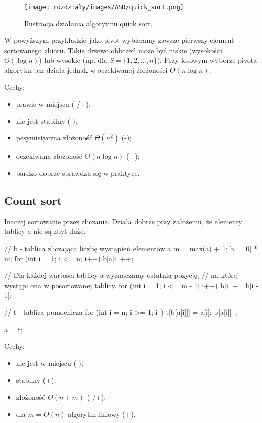 \begin{figure}[H]
    \centering
    \texttt{[image: rozdziały/images/ASD/quick\_sort.png]}
    \caption{Ilustracja działania algorytmu quick sort.}
\end{figure}

W powyższym przykładzie jako pivot wybieramy zawsze pierwszy element sortowanego zbioru. Takie drzewo obliczeń może być niskie (wysokości $O(\log n)$) lub wysokie (np. dla $S = \{1, 2, ..., n\})$. Przy losowym wyborze pivota algorytm ten działa jednak w oczekiwanej złożoności $\Theta(n \log n)$.

Cechy:
\begin{itemize}
    \item prawie w miejscu (-/+);
    \item nie jest stabilny (-);
    \item pesymistyczna złożoność $\Theta(n^2)$ (-);
    \item oczekiwana złożoność $\Theta(n \log n)$ (+);
    \item bardzo dobrze sprawdza się w praktyce.
\end{itemize}

\subsection{Count sort}
Inaczej sortowanie przez zliczanie. Działa dobrze przy założeniu, że elementy tablicy $a$ nie są zbyt duże.
\begin{cpp}
    // b - tablica zliczająca liczbę wystąpień elementów a
    m = max(a) + 1;
    b = [0] * m;
    for (int i = 1; i <= n; i++)
        b[a[i]]++;

    // Dla każdej wartości tablicy a wyznaczamy ostatnią pozycję,
    // na której wystąpi ona w posortowanej tablicy.
    for (int i = 1; i <= m - 1; i++)
        b[i] += b[i - 1];

    // t - tablica pomocnicza
    for (int i = n; i >= 1; i--) {
        t[b[a[i]]] = a[i];
        b[a[i]]--;
    }

    a = t;
\end{cpp}
Cechy:
\begin{itemize}
    \item nie jest w miejscu (-);
    \item stabilny (+);
    \item złożoność $\Theta(n + m)$ (-/+);
    \item dla $m = O(n)$ algorytm liniowy (+).
\end{itemize}

